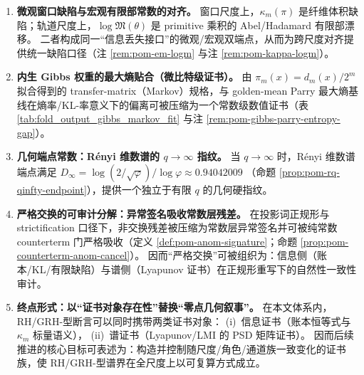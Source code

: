 \begin{enumerate}
  \item \textbf{微观窗口缺陷与宏观有限部常数的对齐。}
  窗口尺度上，\(\kappa_m(\pi)\) 是纤维体积缺陷；轨道尺度上，\(\log\mathfrak{M}(\theta)\) 是 primitive 乘积的 Abel/Hadamard 有限部漂移。
  二者构成同一“信息丢失接口”的微观/宏观双端点，从而为跨尺度对齐提供统一缺陷口径（注 \ref{rem:pom-em-logm} 与注 \ref{rem:pom-kappa-logm}）。

  \item \textbf{内生 Gibbs 权重的最大熵贴合（微比特级证书）。}
  由 \(\pi_m(x)=d_m(x)/2^m\) 拟合得到的 transfer-matrix（Markov）规格，与 golden-mean Parry 最大熵基线在熵率/KL-率意义下的偏离可被压缩为一个常数级数值证书（表 \ref{tab:fold_output_gibbs_markov_fit} 与注 \ref{rem:pom-gibbs-parry-entropy-gap}）。

  \item \textbf{几何端点常数：Rényi 维数谱的 \texorpdfstring{$q\to\infty$}{q->infty} 指纹。}
  当 \(q\to\infty\) 时，Rényi 维数谱端点满足
  \(
  D_\infty=\log(2/\sqrt{\varphi})/\log\varphi\approx 0.94042009
  \)
  （命题 \ref{prop:pom-rq-qinfty-endpoint}），提供一个独立于有限 \(q\) 的几何硬指纹。

  \item \textbf{严格交换的可审计分解：异常签名吸收常数层残差。}
  在投影词正规形与 strictification 口径下，非交换残差被压缩为常数层异常签名并可被纯常数 counterterm 门严格吸收（定义 \ref{def:pom-anom-signature}；命题 \ref{prop:pom-counterterm-anom-cancel}）。
  因而“严格交换”可被组织为：信息侧（账本/KL/有限缺陷）与谱侧（Lyapunov 证书）在正规形重写下的自然性一致性审计。

  \item \textbf{终点形式：以“证书对象存在性”替换“零点几何叙事”。}
  在本文体系内，RH/GRH-型断言可以同时携带两类证书对象：
  (i)~信息证书（账本恒等式与 \(\kappa_m\) 标量语义），
  (ii)~谱证书（Lyapunov/LMI 的 PSD 矩阵证书）。
  因而后续推进的核心目标可表述为：构造并控制随尺度/角色/通道族一致变化的证书族，使 RH/GRH-型谱界在全尺度上以可复算方式成立。
\end{enumerate}

